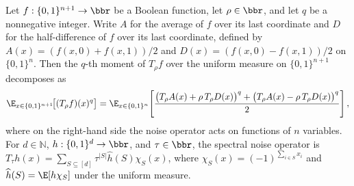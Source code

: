 \begin{lemma}
\leanok
{}
\label{BooleanAnalysis.Hypercontractivity.noise_qth_moment_decomp}
Let $f:\{0,1\}^{n+1}\to\bbr$ be a Boolean function, let $\rho\in\bbr$, and let $q$ be a
nonnegative integer. Write $A$ for the average of $f$ over its last coordinate and $D$
for the half-difference of $f$ over its last coordinate, defined by
$A(x)=(f(x,0)+f(x,1))/2$ and $D(x)=(f(x,0)-f(x,1))/2$
on $\{0,1\}^n$.
Then the $q$-th moment of $T_\rho f$ over the uniform measure on $\{0,1\}^{n+1}$
decomposes as
\[
  \E_{x\in\{0,1\}^{n+1}}\!\bigl[(T_\rho f)(x)^q\bigr]
= \E_{x\in\{0,1\}^{n}}\!\left[\frac{\bigl(T_\rho A(x) + \rho\,T_\rho D(x)\bigr)^{q} +
\bigl(T_\rho A(x) - \rho\,T_\rho D(x)\bigr)^{q}}{2}\right],
\]
where on the right-hand side the noise operator acts on functions of $n$ variables. For
$d\in\mathbb N$, $h:\{0,1\}^d\to\bbr$, and $\tau\in\bbr$, the spectral noise operator is
$T_\tau h(x)=\sum_{S\subseteq[d]}\tau^{|S|}\widehat h(S)\chi_S(x)$, where
$\chi_S(x)=(-1)^{\sum_{i\in S}x_i}$ and $\widehat h(S)=\E[h\chi_S]$ under the uniform
measure.
\end{lemma}

